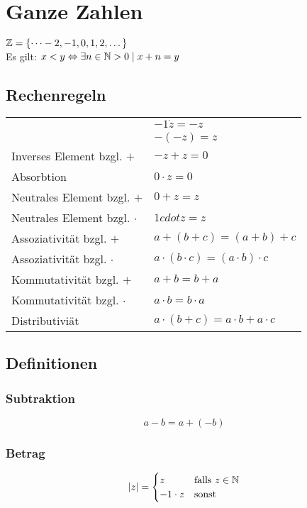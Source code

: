 \section{Ganze Zahlen}
$\mathbb{Z} = \{\cdots -2, -1, 0, 1, 2, \dots\}$\\
Es gilt: $x < y \Leftrightarrow \exists n \in \mathbb{N} > 0 \mid x + n = y$\\
\subsection{Rechenregeln}
\settowidth{\MyLenA}{Neutrales Element bzgl. $+$~~}
\begin{tabular}{@{}p{\the\MyLenA}%
				@{}p{}}
					& $-1 \dot z = -z$\\
					& $-(-z) = z$\\
	Inverses Element bzgl. $+$ & $-z + z = 0$\\
	Absorbtion	& $0 \cdot z = 0$\\
	Neutrales Element bzgl. $+$ & $0 + z = z$\\
	Neutrales Element bzgl. $\cdot$ & $1 cdot z = z$\\
	Assoziativität bzgl. $+$ & $a + (b + c) = (a + b) + c$\\
	Assoziativität bzgl. $\cdot$ & $a \cdot (b \cdot c) = (a \cdot b) \cdot c$\\
	Kommutativität bzgl. $+$ & $a + b = b + a$\\
	Kommutativität bzgl. $\cdot$ & $a \cdot b = b \cdot a$\\
	Distributiviät & $a  \cdot (b + c) = a \cdot b + a \cdot c$\\
\end{tabular}

\subsection{Definitionen}
\subsubsection{Subtraktion}
\begin{equation*}
	a - b = a + (- b)
\end{equation*}

\subsubsection{Betrag}
\begin{align*}
	|z| = \begin{cases}
	      	z & \mbox{falls } z \in \mathbb{N}\\
			-1 \cdot z & \mbox{sonst}
	      \end{cases}
\end{align*}

